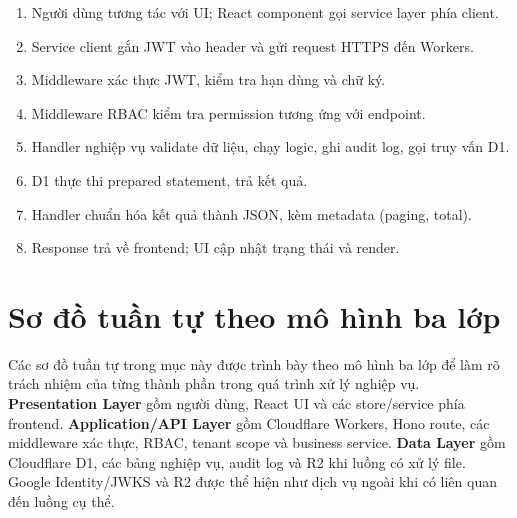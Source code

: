 \begin{enumerate}[leftmargin=1.2cm]
    \item Người dùng tương tác với UI; React component gọi service layer phía client.
    \item Service client gắn JWT vào header và gửi request HTTPS đến Workers.
    \item Middleware xác thực JWT, kiểm tra hạn dùng và chữ ký.
    \item Middleware RBAC kiểm tra permission tương ứng với endpoint.
    \item Handler nghiệp vụ validate dữ liệu, chạy logic, ghi audit log, gọi truy vấn D1.
    \item D1 thực thi prepared statement, trả kết quả.
    \item Handler chuẩn hóa kết quả thành JSON, kèm metadata (paging, total).
    \item Response trả về frontend; UI cập nhật trạng thái và render.
\end{enumerate}

\section{Sơ đồ tuần tự theo mô hình ba lớp}
\label{sec:sequence_diagrams}

Các sơ đồ tuần tự trong mục này được trình bày theo mô hình ba lớp để làm rõ trách nhiệm của từng thành phần trong quá trình xử lý nghiệp vụ. \textbf{Presentation Layer} gồm người dùng, React UI và các store/service phía frontend. \textbf{Application/API Layer} gồm Cloudflare Workers, Hono route, các middleware xác thực, RBAC, tenant scope và business service. \textbf{Data Layer} gồm Cloudflare D1, các bảng nghiệp vụ, audit log và R2 khi luồng có xử lý file. Google Identity/JWKS và R2 được thể hiện như dịch vụ ngoài khi có liên quan đến luồng cụ thể.





